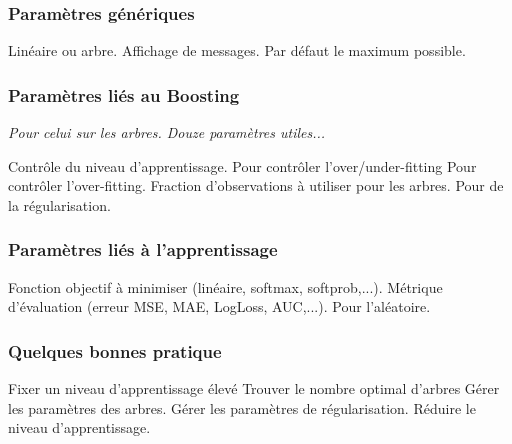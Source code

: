 \begin{frame}
	\frametitle{Paramètres génériques}
	\begin{itemize}
		Linéaire ou arbre.\vspace*{.2cm}
		Affichage de messages.\vspace*{.2cm}
		Par défaut le maximum possible.\vspace*{.2cm}
	\end{itemize}
\end{frame}

\begin{frame}
	\frametitle{Paramètres liés au Boosting}
	\textit{Pour celui sur les arbres. Douze paramètres utiles...}\vspace*{.2cm}

	\begin{itemize}
		Contrôle du niveau d'apprentissage.
		Pour contrôler l'over/under-fitting
		Pour contrôler l'over-fitting.
		Fraction d'observations à utiliser pour les arbres.
		Pour de la régularisation.
		\itemperso{...}
	\end{itemize}
\end{frame}

\begin{frame}
	\frametitle{Paramètres liés à l'apprentissage}
	\begin{itemize}
		Fonction objectif à minimiser (linéaire, softmax, softprob,...).
		Métrique d'évaluation (erreur MSE, MAE, LogLoss, AUC,...).
		Pour l'aléatoire.
	\end{itemize}
\end{frame}

\begin{frame}
	\frametitle{Quelques bonnes pratique}
	\begin{itemize}
		Fixer un niveau d'apprentissage élevé
		Trouver le nombre optimal d'arbres
		Gérer les paramètres des arbres.
		Gérer les paramètres de régularisation.
		Réduire le niveau d'apprentissage.
	\end{itemize}
\end{frame}